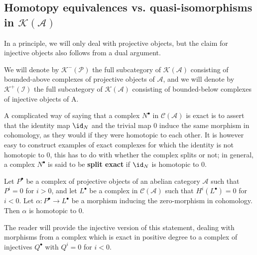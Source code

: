 \subsection{Homotopy equivalences vs. quasi-isomorphisms in $\mathcal{K}(\mathcal{A})$}
In a principle, we will only deal with projective objects, but the claim for injective objects also follows from a dual argument.\par
\begin{definition}
We will denote by $\mathcal{K}^-(\mathcal{P})$ the full subcategory of $\mathcal{K}(\mathcal{A})$ consisting of bounded-above complexes of projective objects of $\mathcal{A}$, and we will denote by $\mathcal{K}^+(\mathcal{I})$ the full subcategory of $\mathcal{K}(\mathcal{A})$ consisting of bounded-below complexes of injective
objects of A.
\end{definition}
A complicated way of saying that a complex $N^\bullet$ in $\mathcal{C}(\mathcal{A})$ is exact is to assert that the identity map $\id_N$ and the trivial map $0$ induce the same morphism in cohomology,
as they would if they were homotopic to each other. It is however easy to construct examples of exact complexes for which the identity is not homotopic to $0$, this has to do with whether the complex
splits or not; in general, a complex $N^\bullet$ is said to be \textbf{split exact} if $\id_N$ is homotopic to $0$.
\begin{lemma}\label{pro homotopy 0}
Let $P^\bullet$ be a complex of projective objects of an abelian category $\mathcal{A}$ such that $P^i=0$ for $i>0$, and let $L^\bullet$ be a complex in $\mathcal{C}(\mathcal{A})$ such that $H^i(L^\bullet)=0$ for $i<0$.
Let $\alpha:P^\bullet\to L^\bullet$ be a morphism inducing the zero-morphism in cohomology. Then $\alpha$ is homotopic to $0$.
\end{lemma}
The reader will provide the injective version of this statement, dealing with morphisms from a complex which is exact in positive degree to a complex of injectives $Q^\bullet$ with $Q^i=0$ for $i<0$.
